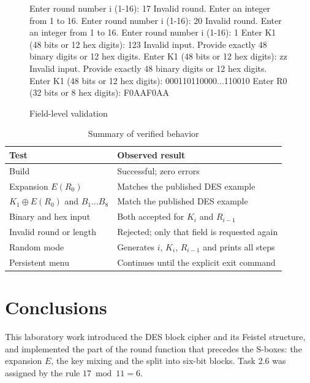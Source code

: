 \documentclass[12pt,a4paper]{article}
\begin{document}
\begin{figure}[H]
\centering
\caption{Field-level validation}
\begin{minipage}{0.96\textwidth}
\begin{terminaloutput}
Enter round number i (1-16): 17
Invalid round. Enter an integer from 1 to 16.
Enter round number i (1-16): 20
Invalid round. Enter an integer from 1 to 16.
Enter round number i (1-16): 1
Enter K1 (48 bits or 12 hex digits): 123
Invalid input. Provide exactly 48 binary digits or 12 hex digits.
Enter K1 (48 bits or 12 hex digits): zz
Invalid input. Provide exactly 48 binary digits or 12 hex digits.
Enter K1 (48 bits or 12 hex digits): 000110110000...110010
Enter R0 (32 bits or 8 hex digits): F0AAF0AA
\end{terminaloutput}
\end{minipage}
\end{figure}

\begin{table}[H]
  \centering
  \caption{Summary of verified behavior}
  \renewcommand{\arraystretch}{1.25}
  \begin{tabular}{>{\raggedright\arraybackslash}p{}>{\raggedright\arraybackslash}p{}}
    \toprule
    \textbf{Test} & \textbf{Observed result} \\
    \midrule
    Build & Successful; zero errors \\
    Expansion $E(R_0)$ & Matches the published DES example \\
    $K_1\oplus E(R_0)$ and $B_1\ldots B_8$ & Match the published DES example \\
    Binary and hex input & Both accepted for $K_i$ and $R_{i-1}$ \\
    Invalid round or length & Rejected; only that field is requested again \\
    Random mode & Generates $i$, $K_i$, $R_{i-1}$ and prints all steps \\
    Persistent menu & Continues until the explicit exit command \\
    \bottomrule
  \end{tabular}
\end{table}

\newpage
\section{Conclusions}

This laboratory work introduced the DES block cipher and its Feistel structure, and implemented the part of the round function that precedes the S-boxes: the expansion $E$, the key mixing and the split into six-bit blocks. Task 2.6 was assigned by the rule $17 \bmod 11 = 6$.
\end{document}
